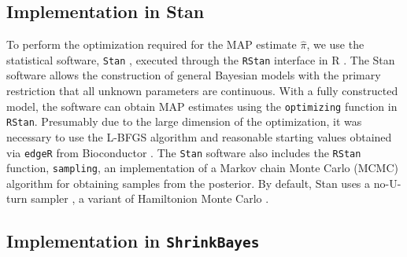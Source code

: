 \documentclass[useAMS,usenatbib,referee]{biom}
\newcommand{\Stan}{Stan}
\newcommand{\RStan}{{\tt RStan}}
\newcommand{\edgeR}{{\tt edgeR}}
\newcommand{\ShrinkBayes}{{\tt ShrinkBayes}}
\begin{document}
\subsection{Implementation in \Stan{}}

To perform the optimization required for the MAP estimate $\hat{\pi}$, we use the statistical software, {\tt Stan} \citep{stan-software:2014}, executed through the \RStan{} interface \citep{rstan-software:2014} in R \citep{R2014}. The Stan software allows the construction of general Bayesian models with the primary restriction that all unknown parameters are continuous. With a fully constructed model, the software can obtain MAP estimates \cite[Section 50.3,][]{stan-manual:2014} using the {\tt optimizing} function in \RStan{}. Presumably due to the large dimension of the optimization, it was necessary to use the L-BFGS algorithm \cite[Section 55,][]{stan-manual:2014} and reasonable starting values obtained via \edgeR{} \citep{robinson2010edgeR} from Bioconductor \citep{gentleman2004bioconductor}. The {\tt Stan} software also includes the \RStan{} function, {\tt sampling}, an implementation of a Markov chain Monte Carlo (MCMC) algorithm for obtaining samples from the posterior. By default, Stan uses a no-U-turn sampler \citep{hoffman2013no}, a variant of Hamiltonion Monte Carlo \citep{neal2011mcmc}.


\subsection{Implementation in \ShrinkBayes{}}
\end{document}

